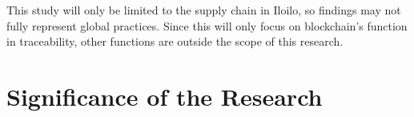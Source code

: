 \noindent This study will only be limited to the supply chain in Iloilo, so findings may not fully represent global practices. Since this will only focus on blockchain’s function in traceability, other functions are outside the scope of this research. 


\begin{comment}

%
%
Generally, one paragraph should be allotted for each of your research objectives.

Each paragraph contains a brief overview of the concept/theory and the purpose of doing the associated objective.

Each paragraph also includes a description of the scope/limitation of your study.

* Please refer to the slides for examples.

\end{comment}


\section{Significance of the Research}
\label{sec:significance}

